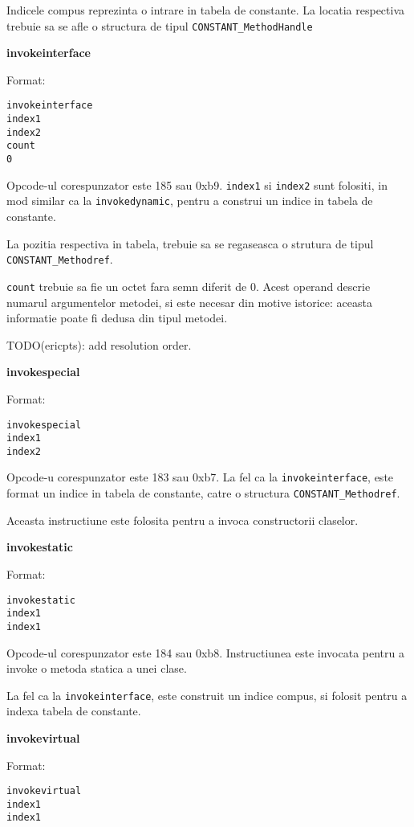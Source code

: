 Indicele compus reprezinta o intrare in tabela de constante. La locatia
respectiva trebuie sa se afle o structura de tipul
\texttt{CONSTANT\_MethodHandle}

\textbf{invokeinterface}

Format:

\begin{verbatim}
invokeinterface
index1
index2
count
0
\end{verbatim}

Opcode-ul corespunzator este 185 sau 0xb9.
\texttt{index1} si \texttt{index2} sunt folositi, in mod similar ca la
\texttt{invokedynamic}, pentru a construi un indice in tabela
de constante.

La pozitia respectiva in tabela, trebuie sa se regaseasca o strutura de
tipul \texttt{CONSTANT\_Methodref}.

\texttt{count} trebuie sa fie un octet fara semn diferit de 0. Acest
operand descrie numarul argumentelor metodei, si este necesar din motive
istorice: aceasta informatie poate fi dedusa din tipul metodei.

TODO(ericpts): add resolution order.

\textbf{invokespecial}

Format:

\begin{verbatim}
invokespecial
index1
index2
\end{verbatim}

Opcode-u corespunzator este 183 sau 0xb7. La fel ca la
\texttt{invokeinterface}, este format un indice in tabela de constante,
catre o structura \texttt{CONSTANT\_Methodref}.

Aceasta instructiune este folosita pentru a invoca constructorii
claselor.

\textbf{invokestatic}

Format:

\begin{verbatim}
invokestatic
index1
index1
\end{verbatim}

Opcode-ul corespunzator este 184 sau 0xb8.
Instructiunea este invocata pentru a invoke o metoda statica a unei
clase.

La fel ca la \texttt{invokeinterface}, este construit un indice compus,
si folosit pentru a indexa tabela de constante.

\textbf{invokevirtual}

Format:

\begin{verbatim}
invokevirtual
index1
index1
\end{verbatim}


